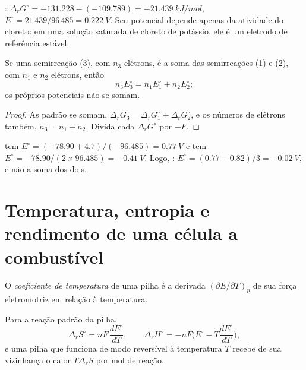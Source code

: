 \begin{example}\label{ex:b2:cell-thermodynamics:agcl}
: $\Delta_r G^\circ = -131.228 - (-109.789) =
\qty{-21.439}{kJ/mol}$, $E^\circ = 21\,439/96\,485 = \qty{0.222}{V}$. Seu potencial
depende apenas da atividade do cloreto: em uma solução saturada de cloreto
de potássio, ele é um eletrodo de referência estável.
\end{example}

\begin{proposition}\label{prop:b2:cell-thermodynamics:combining}
Se uma semirreação (3), com $n_3$ elétrons, é a soma das semirreações (1)
e (2), com $n_1$ e $n_2$ elétrons, então
\[
  n_3E_3^\circ = n_1E_1^\circ + n_2E_2^\circ ;
\]
os próprios potenciais não se somam.
\end{proposition}

\begin{proof}
As  padrão se somam, $\Delta_r G_3^\circ = \Delta_r G_1^\circ + \Delta_r
G_2^\circ$, e os números de elétrons também, $n_3 = n_1 + n_2$. Divida cada $\Delta_r
G^\circ$ por $-F$.
\end{proof}

\begin{example}\label{ex:b2:cell-thermodynamics:iron}
 tem $E^\circ = (-78.90 + 4.7)/(-96.485) = \qty{0.77}{V}$
e  tem $E^\circ = -78.90/(2 \times 96.485) =
\qty{-0.41}{V}$. Logo, : $E^\circ = (0.77 - 0.82)/3 =
\qty{-0.02}{V}$, e não a soma dos dois.
\end{example}

\section{Temperatura, entropia e rendimento de uma célula a combustível}

\begin{definition}\label{def:b2:cell-thermodynamics:temperature-coefficient}
O \emph{coeficiente de temperatura} de uma pilha é
a derivada $(\partial E/\partial T)_p$ de sua força eletromotriz em relação
à temperatura.
\end{definition}

\begin{proposition}\label{prop:b2:cell-thermodynamics:entropy}
Para a reação padrão da pilha,
\[
  \Delta_r S^\circ = nF\,\frac{dE^\circ}{dT}, \qquad
  \Delta_r H^\circ = -nF\Big(E^\circ - T\frac{dE^\circ}{dT}\Big),
\]
e uma pilha que funciona de modo reversível à temperatura $T$ recebe de sua
vizinhança o calor $T\Delta_r S$ por mol de reação.
\end{proposition}

